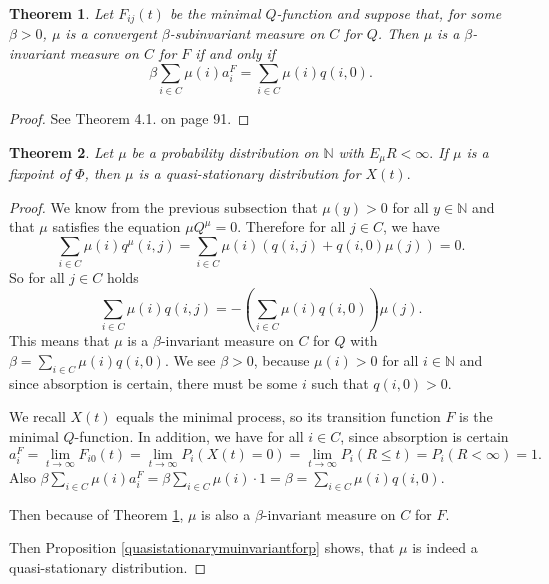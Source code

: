 \documentclass[12pt,a4paper]{scrartcl}
\newtheorem{theorem}{Theorem}[section]
\numberwithin{equation}{section}
\newcommand{\N}{\mathbb{N}} %
\begin{document}
\begin{theorem} \label{eq:fromqinvarianttopinvaraint}
Let $F_{ij}\left(t\right)$ be the minimal $Q$-function and suppose that, for some $\beta > 0$, $\mu$ is a convergent $\beta$-subinvariant measure on $C$ for $Q$. Then $\mu$ is a $\beta$-invariant measure on $C$ for $F$ if and only if
\begin{equation} \label{eq:WeNowItsNecessaryAlready}
\beta \sum_{i \in C} \mu\left(i\right) a_i^F = \sum_{i \in C} \mu\left(i\right) q\left(i,0\right).
\end{equation}
\end{theorem}
\begin{proof}
See \cite{nairpollet} Theorem 4.1. on page 91.
\end{proof}

\begin{theorem}
Let $\mu$ be a probability distribution on $\N$ with $E_{\mu} R < \infty.$ If $\mu$ is a fixpoint of $\Phi$, then $\mu$ is a quasi-stationary distribution for $X\left(t\right).$
\end{theorem}
\begin{proof}
We know from the previous subsection that $\mu\left(y\right) > 0$ for all $y \in \N$ and that $\mu$ satisfies the equation $\mu Q^{\mu} = 0$. Therefore for all $ j \in C$, we have
$$\sum_{i \in C} \mu\left(i\right) q^{\mu}\left(i,j\right) = \sum_{i \in C} \mu\left(i\right) \left(q\left(i,j\right) + q\left(i,0\right) \mu\left(j\right) \right) = 0.$$ So for all $j \in C$ holds
$$\sum_{i \in C} \mu\left(i\right) q\left(i,j\right) = -\left(\sum_{i \in C} \mu\left(i\right) q\left(i,0\right) \right) \mu\left(j\right).$$
This means that $\mu$ is a $\beta$-invariant measure on $C$ for $Q$ with $\beta = \sum_{i \in C} \mu\left(i\right) q\left(i,0\right)$. We see $\beta > 0$, because $\mu\left(i\right) > 0$ for all $i \in \N$ and since absorption is certain, there must be some $i$ such that $q\left(i,0\right) > 0.$  

We recall $X\left(t\right)$ equals the minimal process, so its transition function $F$ is the minimal $Q$-function. In addition, we have for all $i \in C$, since absorption is certain
$$a_i^F = \lim_{t \to \infty} F_{i0}\left(t\right) = \lim_{t \to \infty} P_i\left(X\left(t\right)=0 \right) = \lim_{t \to \infty} P_i\left(R \leq t\right) = P_i\left(R < \infty\right) = 1. $$
Also $\beta \sum_{i \in C} \mu\left(i\right) a_i^F = \beta \sum_{i \in C} \mu\left(i\right) \cdot 1 = \beta = \sum_{i \in C} \mu\left(i\right) q\left(i,0\right).$

Then because of Theorem \ref{eq:fromqinvarianttopinvaraint}, $\mu$ is also a $\beta$-invariant measure on $C$ for $F$.

Then Proposition \ref{quasistationarymuinvariantforp} shows, that $\mu$ is indeed a quasi-stationary distribution.
\end{proof}
\end{document}
